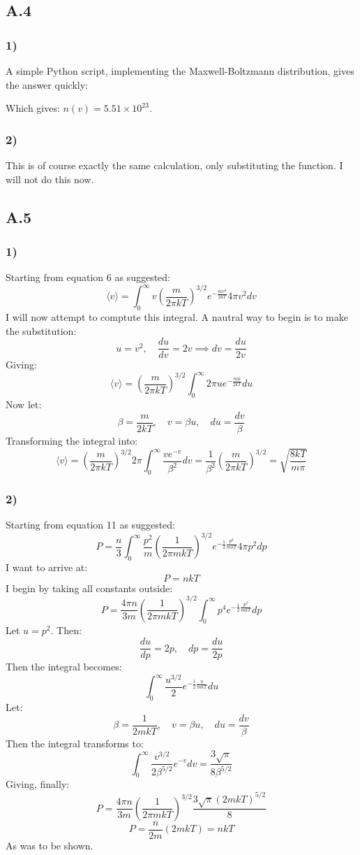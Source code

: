 \documentclass[a4paper,10pt,english]{article}
\begin{document}
\subsection*{A.4}
\subsubsection*{1)}
A simple Python script, implementing the Maxwell-Boltzmann distribution, gives the answer quickly:

Which gives: $n(v)=5.51\times 10^{23}$.
\subsubsection*{2)}
This is of course exactly the same calculation, only substituting the function. I will not do this now.
\subsection*{A.5}
\subsubsection*{1)}
Starting from equation 6 as suggested:
$$\langle v \rangle = \int_0^{\infty} v\left(\frac{m}{2\pi k T}\right)^{3/2} e^{-\frac{mv^2}{2kT}}4\pi v^2 dv$$
I will now attempt to comptute this integral. A nautral way to begin is to make the substitution:
$$u=v^2, \quad \frac{du}{dv}=2v \implies dv = \frac{du}{2v}$$
Giving:
$$\langle v \rangle = \left(\frac{m}{2\pi k T}\right)^{3/2} \int_0^{\infty} 2\pi u e^{-\frac{mu}{2kT}}du$$
Now let:
$$\beta = \frac{m}{2kT}, \quad v=\beta u, \quad du=\frac{dv}{\beta}$$
Transforming the integral into:
$$\langle v \rangle = \left(\frac{m}{2\pi k T}\right)^{3/2}2\pi\int_0^\infty\frac{ve^{-v}}{\beta^2}dv=\frac{1}{\beta^2}\left(\frac{m}{2\pi k T}\right)^{3/2}=\sqrt{\frac{8kT}{m\pi}}$$ 
\subsubsection*{2)}
Starting from equation 11 as suggested:
$$P=\frac{n}{3}\int_0^{\infty}\frac{p^2}{m}\left(\frac{1}{2\pi mk T}\right)^{3/2}e^{-\frac{1}{2}\frac{p^2}{mkT}}4\pi p^2dp$$
I want to arrive at:
$$P=nkT$$
I begin by taking all constants outside:
$$P=\frac{4\pi n}{3m}\left(\frac{1}{2\pi mkT}\right)^{3/2}\int_0^{\infty} p^4 e^{-\frac{1}{2}\frac{p^2}{mkT}}dp$$
Let $u=p^2$. Then:
$$\frac{du}{dp}=2p, \quad dp=\frac{du}{2p}$$
Then the integral becomes:
$$\int_0^{\infty}\frac{u^{3/2}}{2}e^{-\frac{1}{2}\frac{u}{mkT}}du$$
Let:
$$\beta = \frac{1}{2mkT}, \quad v=\beta  u, \quad du=\frac{dv}{\beta}$$
Then the integral transforms to:
$$\int_0^{\infty} \frac{v^{3/2}}{2\beta^{5/2}}e^{-v}dv=\frac{3\sqrt{\pi}}{8\beta^{5/2}}$$
Giving, finally:
$$P=\frac{4\pi n}{3m}\left(\frac{1}{2\pi mkT}\right)^{3/2}\frac{3\sqrt{\pi}(2mkT)^ {5/2}}{8}$$
$$P=\frac{n}{2m}\left(2mkT\right)=nkT$$
As was to be shown.
\end{document}
